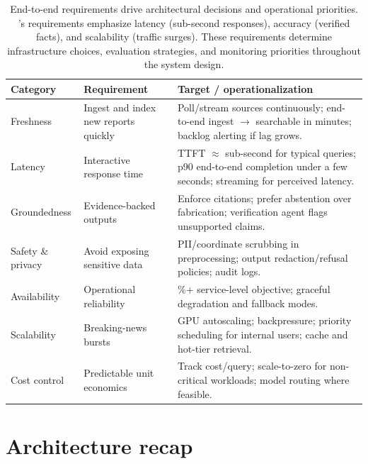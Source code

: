 \begin{table}[t]
\centering
\small
\caption{End-to-end requirements drive architectural decisions and operational priorities. \ishtar{}'s requirements emphasize latency (sub-second responses), accuracy (verified facts), and scalability (traffic surges). These requirements determine infrastructure choices, evaluation strategies, and monitoring priorities throughout the system design.}
\label{tab:ch12_ishtar_requirements}
\setlength{\tabcolsep}{6pt}
\renewcommand{\arraystretch}{1.3}
\begin{tabularx}{0.95\linewidth}{@{}>{\raggedright\arraybackslash}p{32mm}>{\raggedright\arraybackslash}X>{\raggedright\arraybackslash}X@{}}
\toprule
\rowcolor{gray!15}
\textbf{Category} & \textbf{Requirement} & \textbf{Target / operationalization} \\
\midrule
Freshness & Ingest and index new reports quickly & Poll/stream sources continuously; end-to-end ingest $\rightarrow$ searchable in minutes; backlog alerting if lag grows. \\
Latency & Interactive response time & TTFT $\approx$ sub-second for typical queries; p90 end-to-end completion under a few seconds; streaming for perceived latency. \\
Groundedness & Evidence-backed outputs & Enforce citations; prefer abstention over fabrication; verification agent flags unsupported claims. \\
Safety \& privacy & Avoid exposing sensitive data & PII/coordinate scrubbing in preprocessing; output redaction/refusal policies; audit logs. \\
Availability & Operational reliability & 99.5\%+ service-level objective; graceful degradation and fallback modes. \\
Scalability & Breaking-news bursts & GPU autoscaling; backpressure; priority scheduling for internal users; cache and hot-tier retrieval. \\
Cost control & Predictable unit economics & Track cost/query; scale-to-zero for non-critical workloads; model routing where feasible. \\
\bottomrule
\end{tabularx}
\end{table}

\section{Architecture recap}
\label{sec:ishtar-arch}

